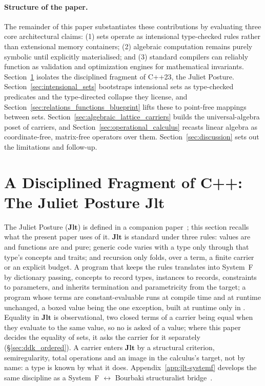 \documentclass[11pt, a4paper]{article}
\begin{document}
\paragraph{Structure of the paper.}
The remainder of this paper substantiates these contributions by evaluating three core architectural claims:
(1) sets operate as intensional type-checked rules rather than extensional memory containers;
(2) algebraic computation remains purely symbolic until explicitly materialised; and
(3) standard compilers can reliably function as validation and optimization engines for mathematical invariants.
Section~\ref{sec:jlt_posture} isolates the disciplined fragment of C++23, the Juliet Posture.
Section~\ref{sec:intensional_sets} bootstraps intensional sets as type-checked predicates and the type-directed collapse they license, and Section~\ref{sec:relations_functions_blueprint} lifts these to point-free mappings between sets.
Section~\ref{sec:algebraic_lattice_carriers} builds the universal-algebra poset of carriers, and Section~\ref{sec:operational_calculus} recasts linear algebra as coordinate-free, matrix-free operators over them.
Section~\ref{sec:discussion} sets out the limitations and follow-up.


\section{A Disciplined Fragment of C++: The Juliet Posture $\mathbf{Jlt}$}
\label{sec:jlt_posture}

The Juliet Posture ($\mathbf{Jlt}$) is defined in a companion paper~\cite{krautler2026jlt}; this section recalls what the present paper uses of it.
$\mathbf{Jlt}$ is standard  under three rules: values are  and functions are  and pure; generic code varies with a type only through that type's concepts and traits; and recursion only folds, over a term, a finite carrier or an explicit budget.
A program that keeps the rules translates into System~F by dictionary passing, concepts to record types, instances to records, constraints to parameters, and inherits termination and parametricity from the target; a program whose terms are constant-evaluable runs at compile time and at runtime unchanged, a boxed value being the one exception, built at runtime only in .
Equality in $\mathbf{Jlt}$ is observational, two closed terms of a carrier being equal when they evaluate to the same value, so no  is asked of a value; where this paper decides the equality of sets, it asks the carrier for it separately (§\ref{sec:ddk_ordered}).
A carrier enters $\mathbf{Jlt}$ by a structural criterion, semiregularity, total  operations and an image in the calculus's target, not by name: a type is known by what it does.
Appendix~\ref{app:jlt-systemf} develops the same discipline as a System~F $\leftrightarrow$ Bourbaki structuralist bridge~\cite{bourbaki1968theoryofsets, marquis2022structuralist}.
\end{document}
